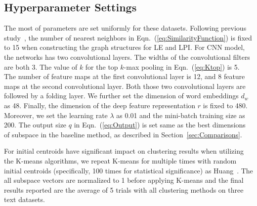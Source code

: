 \documentclass[review]{elsarticle}
\begin{document}
\subsection{Hyperparameter Settings}
The most of parameters are set uniformly for these datasets. Following previous study~\cite{4_cai2005document}, the number of nearest neighbors in Eqn.~(\ref{eq:SimilarityFunction}) is fixed to 15 when constructing the graph structures for LE and LPI. For CNN model, the networks has two convolutional layers. The widths of the convolutional filters are both 3. The value of \(k\) for the top \(k\)-max pooling in Eqn.~(\ref{eq:Ktop}) is 5. The number of feature maps at the first convolutional layer is 12, and 8 feature maps at the second convolutional layer. Both those two convolutional layers are followed by a folding layer. We further set the dimension of word embeddings \({d_w}\) as 48. Finally, the dimension of the deep feature representation \(r\) is fixed to 480. Moreover, we set the learning rate \(\lambda \) as 0.01 and the mini-batch training size as 200. The output size \(q\) in Eqn.~(\ref{eq:Output}) is set same as the best dimensions of subspace in the baseline method, as described in Section~\ref{sec:Comparisons}.

For initial centroids have significant impact on clustering results when utilizing the K-means algorithms, we repeat K-means for multiple times with random initial centroids (specifically, 100 times for statistical significance) as Huang~\cite{1_huang2014deep}. The all subspace vectors are normalized to 1 before applying K-means and the final results reported are the average of 5 trials with all clustering methods on three text datasets.
\end{document}
